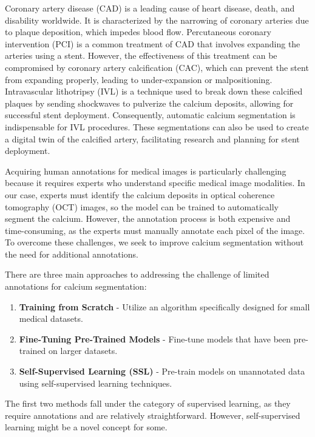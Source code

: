 \documentclass[a4paper,11pt,oneside]{report}
\begin{document}
Coronary artery disease (CAD) is a leading cause of heart disease, death, and disability worldwide. It is characterized by the narrowing of coronary arteries due to plaque deposition, which impedes blood flow. Percutaneous coronary intervention (PCI) is a common treatment of CAD that involves expanding the arteries using a stent. However, the effectiveness of this treatment can be compromised by coronary artery calcification (CAC), which can prevent the stent from expanding properly, leading to under-expansion or malpositioning. Intravascular lithotripsy (IVL) is a technique used to break down these calcified plaques by sending shockwaves to pulverize the calcium deposits, allowing for successful stent deployment. Consequently, automatic calcium segmentation is indispensable for IVL procedures. These segmentations can also be used to create a digital twin of the calcified artery, facilitating research and planning for stent deployment.


Acquiring human annotations for medical images is particularly challenging because it requires experts who understand specific medical image modalities. In our case, experts must identify the calcium deposits in optical coherence tomography (OCT) images, so the model can be trained to automatically segment the calcium. However, the annotation process is both expensive and time-consuming, as the experts must manually annotate each pixel of the image. To overcome these challenges, we seek to improve calcium segmentation without the need for additional annotations.

There are three main approaches to addressing the challenge of limited annotations for calcium segmentation: 
\begin{enumerate}
    \item \textbf{Training from Scratch} - Utilize an algorithm specifically designed for small medical datasets.
    \item \textbf{Fine-Tuning Pre-Trained Models} - Fine-tune models that have been pre-trained on larger datasets.
    \item \textbf{Self-Supervised Learning (SSL)} - Pre-train models on unannotated data using self-supervised learning techniques.
\end{enumerate}
The first two methods fall under the category of supervised learning, as they require annotations and are relatively straightforward. However, self-supervised learning might be a novel concept for some.
\end{document}
